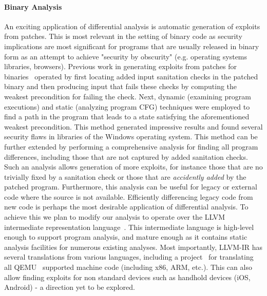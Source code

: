 
\paragraph{Binary Analysis}
An exciting application of differential analysis is automatic generation of exploits from patches. This is most relevant in the setting of binary code as security implications are most significant for programs that are usually released in binary form as an attempt to achieve "security by obscurity" (e.g. operating systems libraries, browsers). Previous work in generating exploits from patches for binaries~\cite{BrumleyPoosankamSongZheng08} operated by first locating added input sanitation checks in the patched binary and then producing input that fails these checks by computing the weakest precondition for failing the check. Next, dynamic (examining program executions) and static (analyzing program CFG) techniques were employed to find a path in the program that leads to a state satisfying the aforementioned weakest precondition. This method generated impressive results and found several security flaws in libraries of the Windows operating system. This method can be further extended by performing a comprehensive analysis for finding all program differences, including those that are not captured by added sanitation checks. Such an analysis allows generation of more exploits, for instance those that are no trivially fixed by a sanitation check or those that are \emph{accidently added} by the patched program. Furthermore, this analysis can be useful for legacy or external code where the source is not available. Efficiently differencing legacy code from new code is perhaps the most desirable application of differential analysis. To achieve this we plan to modify our analysis to operate over the LLVM intermediate representation language~\cite{LattnerAdve04}. This intermediate language is high-level enough to support program analysis, and mature enough as it contains static analysis facilities for numerous existing analyses. Most importantly, LLVM-IR has several translations from various languages, including a project~\cite{Scheller:2009} for translating all QEMU~\cite{Bellard05} supported machine code (including x86, ARM, etc.). This can also allow finding exploits for non standard devices such as handhold devices (iOS, Android) - a direction yet to be explored.


